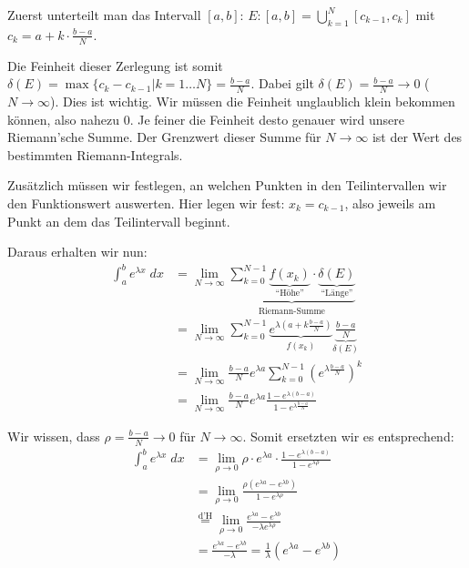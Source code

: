 Zuerst unterteilt man das Intervall $[a,b]$: $E: [a,b] =
\bigcup_{k=1}^N[c_{k-1}, c_k]$ mit $c_k = a + k\cdot \frac{b-a}{N}$.

Die Feinheit dieser Zerlegung ist somit $\delta(E) = \max\{c_k - c_{k-1} | k =
1 \ldots N\} = \frac{b-a}{N}$. Dabei gilt $\delta(E) = \frac{b-a}{N} \to 0$ ($N
\to \infty$). Dies ist wichtig. Wir müssen die Feinheit unglaublich klein
bekommen können, also nahezu $0$. Je feiner die Feinheit desto genauer wird
unsere Riemann'sche Summe. Der Grenzwert dieser Summe für $N \to \infty$ ist der
Wert des bestimmten Riemann-Integrals.

Zusätzlich müssen wir festlegen, an welchen Punkten in den Teilintervallen wir
den Funktionswert auswerten. Hier legen wir fest: $x_k = c_{k-1}$, also
jeweils am Punkt an dem das Teilintervall beginnt.

Daraus erhalten wir nun:
\begin{align*}
\int_a^b e^{\lambda x}\;dx &= \lim_{N \to \infty} \underbrace{\sum_{k=0}^{N-1}
\underbrace{f(x_k)}_{\text{``Höhe''}} \cdot
\underbrace{\delta(E)}_{\text{``Länge''}}}_{\text{Riemann-Summe}}\\
&= \lim_{N \to \infty} \sum_{k=0}^{N-1} \underbrace{e^{\lambda (a +
k\frac{b-a}{N})}}_{f(x_k)} \underbrace{\frac{b-a}{N}}_{\delta(E)}\\
&= \lim_{N \to \infty} \frac{b-a}{N} e^{\lambda a} \sum_{k=0}^{N-1}(e^{\lambda
\frac{b-a}{N}})^k\\
&= \lim_{N \to \infty} \frac{b-a}{N} e^{\lambda a} \frac{1-e^{\lambda
(b-a)}}{1-e^{\lambda \frac{b-a}{N}}}
\end{align*}

Wir wissen, dass $\rho = \frac{b-a}{N} \to 0$ für $N \to \infty$. Somit
ersetzten wir es entsprechend:
\begin{align*}
\int_a^b e^{\lambda x}\;dx &= \lim_{\rho \to 0} \rho \cdot e^{\lambda a} \cdot
\frac{1-e^{\lambda(b-a)}}{1-e^{\lambda \rho}}\\
&= \lim_{\rho \to 0} \frac{\rho (e^{\lambda a} - e^{\lambda b})}{1-e^{\lambda
\rho}}\\
&\overset{\text{d'H}}= \lim_{\rho \to 0} \frac{e^{\lambda a} - e^{\lambda
b}}{-\lambda e^{\lambda \rho}}\\
&= \frac{e^{\lambda a} - e^{\lambda b}}{-\lambda} = \frac{1}{\lambda}(e^{\lambda
a} - e^{\lambda b})
\end{align*}
